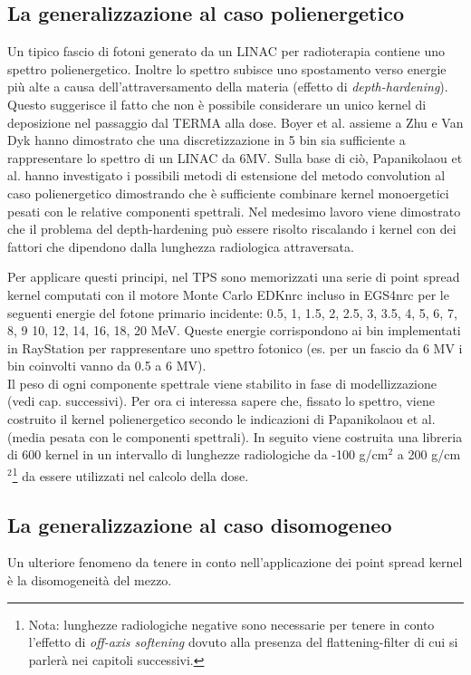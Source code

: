 {\subsection{La generalizzazione al caso polienergetico}
Un tipico fascio di fotoni generato da un LINAC per radioterapia contiene uno spettro polienergetico. Inoltre lo spettro subisce uno spostamento verso energie più alte a causa dell'attraversamento della materia (effetto di \textit{depth-hardening}). Questo suggerisce il fatto che non è possibile considerare un unico kernel di deposizione nel passaggio dal TERMA alla dose. Boyer et al. assieme a Zhu e Van Dyk \cite{Boyer1989,Zhu1995} hanno dimostrato che una discretizzazione in 5 bin sia sufficiente a rappresentare lo spettro di un LINAC da 6MV. Sulla base di ciò, Papanikolaou et al. \cite{Papanikolaou1993} hanno investigato i possibili metodi di estensione del metodo convolution al caso polienergetico dimostrando che è sufficiente combinare kernel monoergetici pesati con le relative componenti spettrali. Nel medesimo lavoro viene dimostrato che il problema del depth-hardening può essere risolto riscalando i kernel con dei fattori che dipendono dalla lunghezza radiologica attraversata.

Per applicare questi principi, nel TPS sono memorizzati una serie di point spread kernel computati con il motore Monte Carlo EDKnrc incluso in EGS4nrc per le seguenti energie del fotone primario incidente: 0.5, 1, 1.5, 2, 2.5, 3, 3.5, 4, 5, 6, 7, 8, 9 10, 12, 14, 16, 18, 20 MeV. Queste energie corrispondono ai bin implementati in RayStation per rappresentare uno spettro fotonico (es. per un fascio da 6 MV i bin coinvolti vanno da 0.5 a 6 MV).\\
Il peso di ogni componente spettrale viene stabilito in fase di modellizzazione (vedi cap. successivi). Per ora ci interessa sapere che, fissato lo spettro, viene costruito il kernel polienergetico secondo le indicazioni di Papanikolaou et al. \cite{Papanikolaou1993} (media pesata con le componenti spettrali). In seguito viene costruita una libreria di 600 kernel in un intervallo di lunghezze radiologiche da -100 g/cm$^2$ a 200 g/cm$^2$\footnote{Nota: lunghezze radiologiche negative sono necessarie per tenere in conto l'effetto di \textit{off-axis softening} dovuto alla presenza del flattening-filter di cui si parlerà nei capitoli successivi.} da essere utilizzati nel calcolo della dose.


\subsection{La generalizzazione al caso disomogeneo}
Un ulteriore fenomeno da tenere in conto nell'applicazione dei point spread kernel è la disomogeneità del mezzo. 

}
